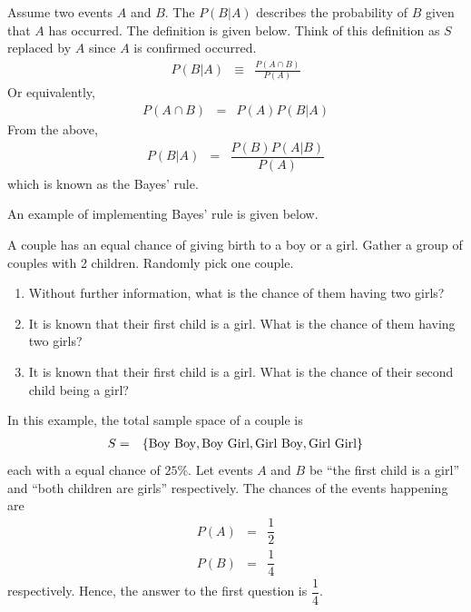 Assume two events $A$ and $B$. The  $P(B|A)$ describes the probability of $B$ given that $A$ has occurred. The definition is given below. Think of this definition as $S$ replaced by $A$ since $A$ is confirmed occurred.
\begin{eqnarray}
  P(B|A) &\equiv& \frac{P(A\cap B)}{P(A)} \nonumber
\end{eqnarray}
Or equivalently,
\begin{eqnarray}
  P(A\cap B) &=& P(A)P(B|A) \nonumber
\end{eqnarray}
From the above,
\begin{eqnarray}
  P(B|A) &=& \dfrac{P(B)P(A|B)}{P(A)} \nonumber
\end{eqnarray}
which is known as the Bayes' rule.

An example of implementing Bayes' rule is given below.

\begin{shortbox}

A couple has an equal chance of giving birth to a boy or a girl. Gather a group of couples with 2 children. Randomly pick one couple.

\begin{enumerate}
	\item Without further information, what is the chance of them having two girls?
	\item It is known that their first child is a girl. What is the chance of them having two girls?
	\item It is known that their first child is a girl. What is the chance of their second child being a girl?
\end{enumerate}

\end{shortbox}

In this example, the total sample space of a couple is 
\begin{eqnarray}
S &=& \{\textup{Boy Boy}, \textup{Boy Girl}, \textup{Girl Boy}, \textup{Girl Girl}\} \nonumber
\end{eqnarray}
each with a equal chance of $25\%$. Let events $A$ and $B$ be ``the first child is a girl'' and ``both children are girls'' respectively. The chances of the events happening are
\begin{eqnarray}
P(A) &=& \dfrac{1}{2} \nonumber \\
P(B) &=& \dfrac{1}{4} \nonumber
\end{eqnarray}
respectively. Hence, the answer to the first question is $\dfrac{1}{4}$.

